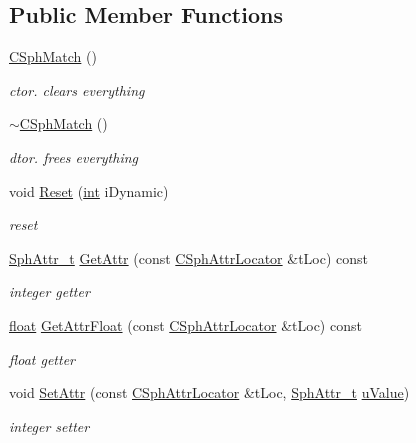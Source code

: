 \subsection*{Public Member Functions}
\begin{DoxyCompactItemize}
\item 
\hyperlink{classCSphMatch_a7428e80c3f505a6ca4f4f78a824bb9d1}{C\-Sph\-Match} ()
\begin{DoxyCompactList}\small\item\em ctor. clears everything \end{DoxyCompactList}\item 
\hyperlink{classCSphMatch_a59410bb44b69726fa2aef802cafe85ba}{$\sim$\-C\-Sph\-Match} ()
\begin{DoxyCompactList}\small\item\em dtor. frees everything \end{DoxyCompactList}\item 
void \hyperlink{classCSphMatch_a9c089492cb2f85e11f95f4e2472d2490}{Reset} (\hyperlink{sphinxexpr_8cpp_a4a26e8f9cb8b736e0c4cbf4d16de985e}{int} i\-Dynamic)
\begin{DoxyCompactList}\small\item\em reset \end{DoxyCompactList}\item 
\hyperlink{sphinx_8h_a7c122d91b0b52a0214ba176636bb1561}{Sph\-Attr\-\_\-t} \hyperlink{classCSphMatch_a7815028ab8bfbe58ef6748c9eab6e1db}{Get\-Attr} (const \hyperlink{structCSphAttrLocator}{C\-Sph\-Attr\-Locator} \&t\-Loc) const 
\begin{DoxyCompactList}\small\item\em integer getter \end{DoxyCompactList}\item 
\hyperlink{sphinxexpr_8cpp_a0e0d0739f7035f18f949c2db2c6759ec}{float} \hyperlink{classCSphMatch_aaa22bcf87b728f819ef350d4192e006c}{Get\-Attr\-Float} (const \hyperlink{structCSphAttrLocator}{C\-Sph\-Attr\-Locator} \&t\-Loc) const 
\begin{DoxyCompactList}\small\item\em float getter \end{DoxyCompactList}\item 
void \hyperlink{classCSphMatch_a681c1e17cb42f5063873395b7a065673}{Set\-Attr} (const \hyperlink{structCSphAttrLocator}{C\-Sph\-Attr\-Locator} \&t\-Loc, \hyperlink{sphinx_8h_a7c122d91b0b52a0214ba176636bb1561}{Sph\-Attr\-\_\-t} \hyperlink{sphinxsort_8cpp_a7906295a5b0753053dbc737117036d06}{u\-Value})
\begin{DoxyCompactList}\small\item\em integer setter \end{DoxyCompactList}\item 

\end{DoxyCompactItemize}
